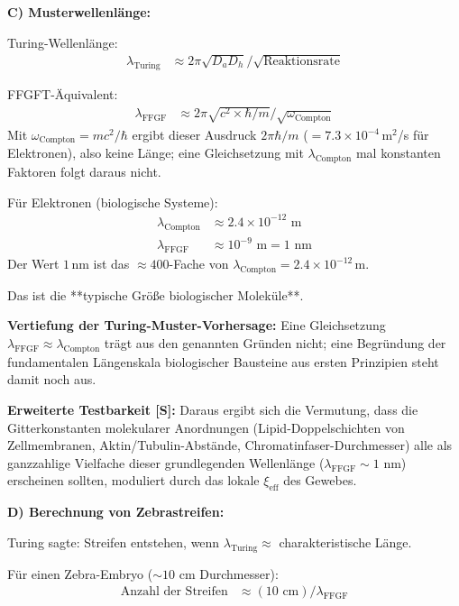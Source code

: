 \textbf{C) Musterwellenlänge:}

Turing-Wellenlänge:
\begin{align*}
	\lambda_{\text{Turing}} &\approx 2\pi \sqrt{D_a D_h} / \sqrt{\text{Reaktionsrate}}
\end{align*}

FFGFT-Äquivalent:
\begin{align*}
	\lambda_{\text{FFGF}} &\approx 2\pi \sqrt{c^2 \times \hbar/m} / \sqrt{\omega_{\text{Compton}}}
\end{align*}
Mit $\omega_{\text{Compton}} = mc^2/\hbar$ ergibt dieser Ausdruck $2\pi\hbar/m$ ($= 7.3\times10^{-4}$\,m$^2$/s für Elektronen), also keine Länge; eine Gleichsetzung mit $\lambda_{\text{Compton}}$ mal konstanten Faktoren folgt daraus nicht.

Für Elektronen (biologische Systeme):
\begin{align*}
	\lambda_{\text{Compton}} &\approx 2.4 \times 10^{-12} \text{ m} \\
	\lambda_{\text{FFGF}} &\approx 10^{-9} \text{ m} = 1 \text{ nm}
\end{align*}
Der Wert $1$\,nm ist das $\approx 400$-Fache von $\lambda_{\text{Compton}} = 2.4\times10^{-12}$\,m.

Das ist die **typische Größe biologischer Moleküle**.

\textbf{Vertiefung der Turing-Muster-Vorhersage:}
Eine Gleichsetzung $\lambda_{\text{FFGF}} \approx \lambda_{\text{Compton}}$ trägt aus den genannten Gründen nicht; eine Begründung der fundamentalen Längenskala biologischer Bausteine aus ersten Prinzipien steht damit noch aus.

\textbf{Erweiterte Testbarkeit [S]:} Daraus ergibt sich die Vermutung, dass die Gitterkonstanten molekularer Anordnungen (Lipid-Doppelschichten von Zellmembranen, Aktin/Tubulin-Abstände, Chromatinfaser-Durchmesser) alle als ganzzahlige Vielfache dieser grundlegenden Wellenlänge ($\lambda_{\text{FFGF}} \sim 1$ nm) erscheinen sollten, moduliert durch das lokale $\xi_{\text{eff}}$ des Gewebes.

\textbf{D) Berechnung von Zebrastreifen:}

Turing sagte: Streifen entstehen, wenn $\lambda_{\text{Turing}} \approx$ charakteristische Länge.

Für einen Zebra-Embryo ($\sim 10$ cm Durchmesser):
\begin{align*}
	\text{Anzahl der Streifen} &\approx (10 \text{ cm}) / \lambda_{\text{FFGF}}
\end{align*}

